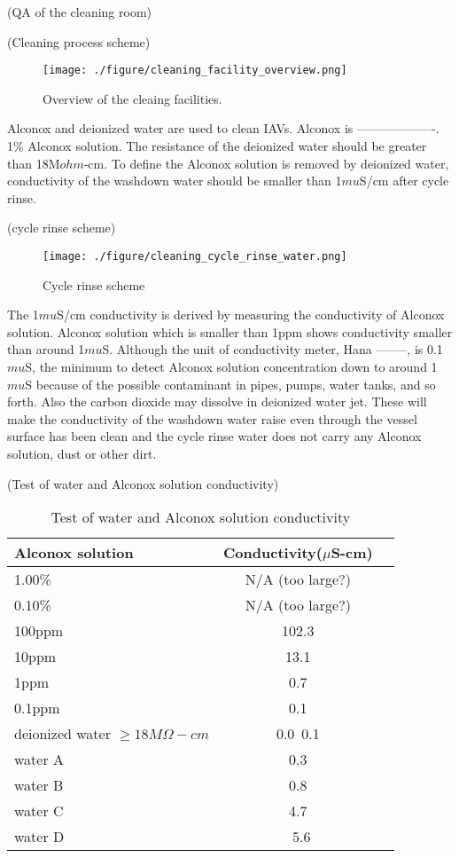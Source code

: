(QA of the cleaning room)




(Cleaning process scheme)
\begin{figure}
    \centering
    \texttt{[image: ./figure/cleaning\_facility\_overview.png]}
    \caption{Overview of the cleaing facilities.}
    \label{cleaning_facility_overview.png}
    \end{figure}

Alconox and deionized water are used to clean IAVs. Alconox is -------------------.
1\% Alconox solution.
The resistance of the deionized water should be greater than 18M$ohm$-cm.
To define the Alconox solution is removed by deionized water, conductivity of the
washdown water should be smaller than 1$mu$S/cm after cycle rinse.


(cycle rinse scheme)
\begin{figure}
    \centering
    \texttt{[image: ./figure/cleaning\_cycle\_rinse\_water.png]}
    \caption{Cycle rinse scheme}
    \label{cleaning_cycle_rinse_water.png}
    \end{figure}

The 1$mu$S/cm conductivity is derived by measuring the conductivity of Alconox solution.
Alconox solution which is smaller than 1ppm shows conductivity smaller than around 1$mu$S.
Although the unit of conductivity meter, Hana --------, is 0.1 $mu$S, the minimum to detect
Alconox solution concentration down to around 1$mu$S because of the possible contaminant
in pipes, pumps, water tanks, and so forth. Also the carbon dioxide may dissolve in
deionized water jet. These will make the conductivity of the washdown water raise
even through the vessel surface has been clean and the cycle rinse water does not
carry any Alconox solution, dust or other dirt.


(Test of water and Alconox solution conductivity)
\begin{table}
\centering
\caption{Test of water and Alconox solution conductivity}
\label{tab:AlconoxConductivity}
\begin{tabular}{lcp{5.0cm}}
Alconox solution &   Conductivity($\mu$S-cm) \\
\hline
\hline
1.00\% &  N/A (too large?)\\
\hline
0.10\% &  N/A (too large?)\\
\hline
100ppm & 102.3\\
\hline
10ppm  & 13.1\\
\hline
1ppm   & 0.7\\
\hline
0.1ppm & 0.1\\
\hline
deionized water $\geq 18M\Omega-cm$ &0.0~0.1\\
\hline
water A &0.3\\
\hline
water B &0.8\\
\hline
water C &4.7\\
\hline
water D &~5.6\\
\hline
\end{tabular}
\end{table}



